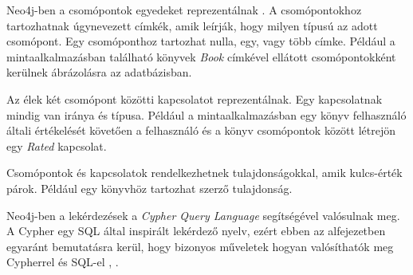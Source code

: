Neo4j-ben a csomópontok egyedeket reprezentálnak \cite{adatok-leirasa}. A csomópontokhoz tartozhatnak úgynevezett címkék, amik leírják, hogy milyen típusú az adott csomópont. Egy csomóponthoz tartozhat nulla, egy, vagy több címke. Például a mintaalkalmazásban található könyvek \textit{Book} címkével ellátott csomópontokként kerülnek ábrázolásra az adatbázisban.

Az élek két csomópont közötti kapcsolatot reprezentálnak. Egy kapcsolatnak mindig van iránya és típusa. Például a mintaalkalmazásban egy könyv felhasználó általi értékelését követően a felhasználó és a könyv csomópontok között létrejön egy \textit{Rated} kapcsolat.

Csomópontok és kapcsolatok rendelkezhetnek tulajdonságokkal, amik kulcs-érték párok. Például egy könyvhöz tartozhat szerző tulajdonság.




Neo4j-ben a lekérdezések a \textit{Cypher Query Language} segítségével valósulnak meg. A Cypher egy SQL által inspirált lekérdező nyelv, ezért ebben az alfejezetben egyaránt bemutatásra kerül, hogy bizonyos műveletek hogyan valósíthatók meg Cypherrel és SQL-el \cite{cypher}, \cite{sql}.



